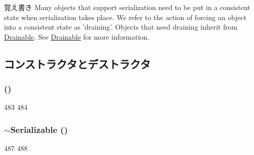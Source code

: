 \begin{DoxyNote}{覚え書き}
Many objects that support serialization need to be put in a consistent state when serialization takes place. We refer to the action of forcing an object into a consistent state as 'draining'. Objects that need draining inherit from \hyperlink{classDrainable}{Drainable}. See \hyperlink{classDrainable}{Drainable} for more information. 
\end{DoxyNote}


\subsection{コンストラクタとデストラクタ}
\hypertarget{classSerializable_a5337d2e15eb1015f082089009cc0eab4}{
\subsubsection[{Serializable}]{ ()}}
\label{classSerializable_a5337d2e15eb1015f082089009cc0eab4}



\begin{DoxyCode}
483 {
484 }
\end{DoxyCode}
\hypertarget{classSerializable_af4712193652249f021f08d4de52f7573}{
\subsubsection[{$\sim$Serializable}]{\setlength{\rightskip}{0pt plus 5cm}$\sim${\bf Serializable} ()}}
\label{classSerializable_af4712193652249f021f08d4de52f7573}



\begin{DoxyCode}
487 {
488 }
\end{DoxyCode}


